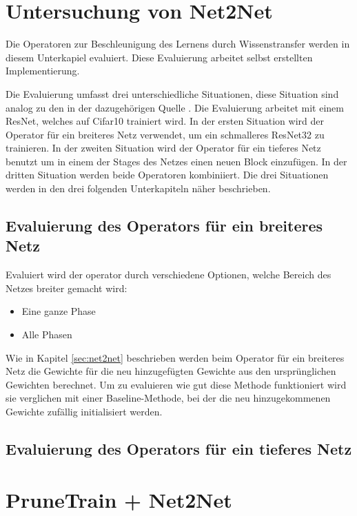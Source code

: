 \section{Untersuchung von Net2Net}\label{sec:net2netexperimente}
\color{blue1}
Die Operatoren zur Beschleunigung des Lernens durch Wissenstransfer werden in diesem Unterkapiel evaluiert. Diese Evaluierung arbeitet selbst erstellten Implementierung.

Die Evaluierung umfasst drei unterschiedliche Situationen, diese Situation sind analog zu den in der dazugehörigen Quelle \cite{net2net}. Die Evaluierung arbeitet mit einem ResNet, welches auf Cifar10 trainiert wird. In der ersten Situation wird der Operator für ein breiteres Netz verwendet, um ein schmalleres ResNet32 zu trainieren. In der zweiten Situation wird der Operator für ein tieferes Netz benutzt um in einem der Stages des Netzes einen neuen Block einzufügen. In der dritten Situation werden beide Operatoren kombiniiert.
Die drei Situationen werden in den drei folgenden Unterkapiteln näher beschrieben.

\subsection{Evaluierung des Operators für ein breiteres Netz}
Evaluiert wird der operator durch verschiedene Optionen, welche Bereich des Netzes breiter gemacht wird:
\begin{itemize}
 \item Eine ganze Phase
 \item Alle Phasen
\end{itemize}
Wie in Kapitel \ref{sec:net2net} beschrieben werden beim Operator für ein breiteres Netz die Gewichte für die neu hinzugefügten Gewichte aus den ursprünglichen Gewichten berechnet. Um zu evaluieren wie gut diese Methode funktioniert wird sie verglichen mit einer Baseline-Methode, bei der die neu hinzugekommenen Gewichte zufällig initialisiert werden.
\subsection{Evaluierung des Operators für ein tieferes Netz}

\color{black}



\section{PruneTrain + Net2Net}\label{sec:ptpnet2net}

